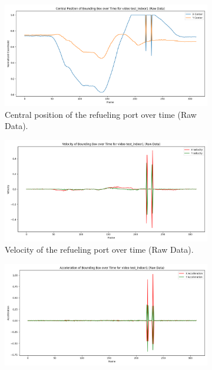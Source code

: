 \documentclass[12pt,oneside]{book} %
\begin{document}
\newpage
\begin{figure}[H]
    \centering
    \begin{subfigure}[t]{0.45\textwidth}
        \includegraphics[width=\textwidth]{figures/bbox_metrics/test_indoor1 (Raw Data)_central_position.png}
        \caption{Central position of the refueling port over time (Raw Data).}
        \label{fig:central-position-test-indoor1}
    \end{subfigure}
    \hfill
    \begin{subfigure}[t]{0.45\textwidth}
        \includegraphics[width=\textwidth]{figures/bbox_metrics/test_indoor1 (Raw Data)_velocity.png}
        \caption{Velocity of the refueling port over time (Raw Data).}
        \label{fig:velocity-test-indoor1}
    \end{subfigure}
    \vfill
    \begin{subfigure}[t]{0.45\textwidth}
        \includegraphics[width=\textwidth]{figures/bbox_metrics/test_indoor1 (Raw Data)_acceleration.png}

\end{subfigure}
\end{figure}
\end{document}
